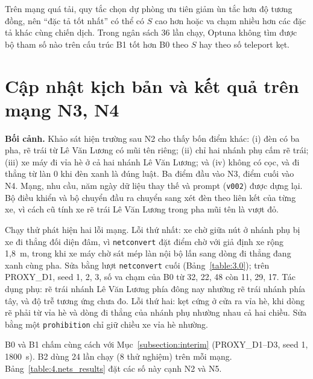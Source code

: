 \documentclass[../main.tex]{subfiles}
\begin{document}
Trên mạng quá tải, quy tắc chọn dự phòng ưu tiên giảm ùn tắc hơn độ tương đồng, nên ``đặc tả tốt nhất'' có thể có $S$ cao hơn hoặc va chạm nhiều hơn các đặc tả khác cùng chiến dịch. Trong ngân sách 36 lần chạy, Optuna không tìm được bộ tham số nào trên cấu trúc B1 tốt hơn B0 theo $S$ hay theo số teleport kẹt.

\section{Cập nhật kịch bản và kết quả trên mạng N3, N4}
\label{subsection:scenario_update}

\textbf{Bối cảnh.} Khảo sát hiện trường sau N2 cho thấy bốn điểm khác: (i) đèn có ba pha, rẽ trái từ Lê Văn Lương có mũi tên riêng; (ii) chỉ hai nhánh phụ cấm rẽ trái; (iii) xe máy đi vỉa hè ở cả hai nhánh Lê Văn Lương; và (iv) không có cọc, và đi thẳng từ làn 0 khi đèn xanh là đúng luật. Ba điểm đầu vào N3, điểm cuối vào N4. Mạng, nhu cầu, năm ngày dữ liệu thay thế và prompt (\texttt{v002}) được dựng lại. Bộ điều khiển và bộ chuyển đầu ra chuyển sang xét đèn theo liên kết của từng xe, vì cách cũ tính xe rẽ trái Lê Văn Lương trong pha mũi tên là vượt đỏ.

Chạy thử phát hiện hai lỗi mạng. Lỗi thứ nhất: xe chờ giữa nút ở nhánh phụ bị xe đi thẳng đối diện đâm, vì \texttt{netconvert} đặt điểm chờ với giả định xe rộng 1,8~m, trong khi xe máy chờ sát mép làn nội bộ lấn sang dòng đi thẳng đang xanh cùng pha. Sửa bằng lượt \texttt{netconvert} cuối (Bảng~\ref{table:3.0}); trên PROXY\_D1, seed 1, 2, 3, số va chạm của B0 từ 32, 22, 48 còn 11, 29, 17. Tác dụng phụ: rẽ trái nhánh Lê Văn Lương phía đông nay nhường rẽ trái nhánh phía tây, và độ trễ tương ứng chưa đo. Lỗi thứ hai: kẹt cứng ở cửa ra vỉa hè, khi dòng rẽ phải từ vỉa hè và dòng đi thẳng của nhánh phụ nhường nhau cả hai chiều. Sửa bằng một \texttt{prohibition} chỉ giữ chiều xe vỉa hè nhường.

B0 và B1 chấm cùng cách với Mục~\ref{subsection:interim} (PROXY\_D1--D3, seed 1, 1800~s). B2 dùng 24 lần chạy (8 thử nghiệm) trên mỗi mạng. Bảng~\ref{table:4.nets_results} đặt các số này cạnh N2 và N5.
\end{document}
